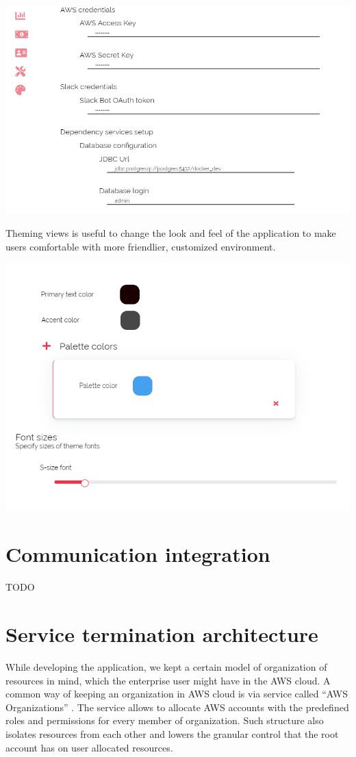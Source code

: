 \documentclass[licencjacka,en]{thesisclass}
\begin{document}
    \includegraphics[width=\textwidth] {imgs/screenshots/screen_customize_settings.png}
    
    Theming views is useful to change the look and feel of the application to make users comfortable with more friendlier, customized environment.
    
    \includegraphics[width=\textwidth] {imgs/screenshots/screen_customize_theme.png}
    
    \section{Communication integration}
    TODO
    \section{Service termination architecture}
    While developing the application, we kept a certain model of organization of resources in mind, which the enterprise user might have in the AWS cloud. A common way of keeping an organization in AWS cloud is via service called “AWS Organizations” \cite{AWSOrganizations}. The service allows to allocate AWS accounts with the predefined roles and permissions for every member of organization. Such structure also isolates resources from each other and lowers the granular control that the root account has on user allocated resources.
\end{document}
